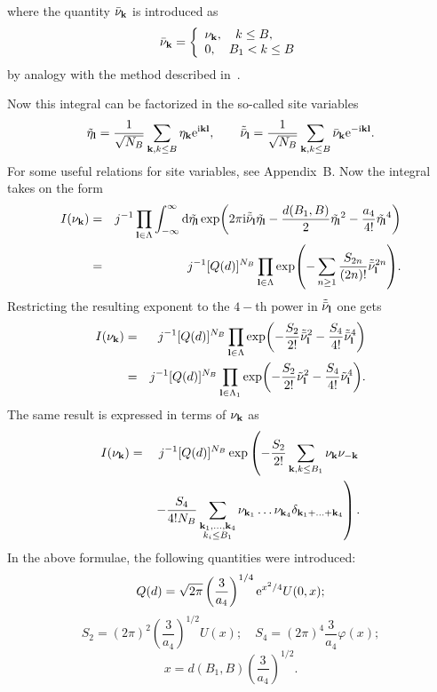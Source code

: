where the quantity $\bar{\nu}_{\vb k}$ is introduced as
\begin{equation*}
	\bar{\nu}_{\vb k} = \left\{
	\begin{array}{ll}
		\nu_{\vb k}, \quad k \leq B, \\
		0, \quad B_1 < k \leq B
	\end{array}
	\right.
\end{equation*}
by analogy with the method described in~\cite{MpkCMP2005}.

Now this integral can be factorized in the so-called site variables
\begin{equation*}
	\tilde{\eta}_{\vb l} = \frac{1}{\sqrt{N_B}}\sum_{\vb k, k \leq B}\eta_{\vb k}{\rm e}^{{\rm i}{\vb k}{\vb l}}, \qquad \tilde{\bar{\nu}}_{\vb l}=\frac{1}{\sqrt{N_B}}\sum_{\vb k, k \leq B}\bar{\nu}_{\vb k}{\rm e}^{-{\rm i}{\vb k}{\vb l}}.
\end{equation*}
For some useful relations for site variables, see Appendix~B.
Now the integral takes on the form
\begin{eqnarray*}
	I(\nu_{\vb k}) & = & j^{-1} \prod_{\vb l \in \Lambda} \int_{-\infty}^{\infty} {\rm d} \tilde{\eta_{\vb l}}
	\exp(2\pi{\rm i} \tilde{\bar{\nu}}_{\vb l} \tilde{\eta_{\vb l}} -\frac{d(B_1, B)}{2} \tilde{\eta_{\vb l}}^2 - \frac{a_4}{4!}\tilde{\eta_{\vb l}}^4 )
	\\
	& = & j^{-1} [Q(d)]^{N_B} \prod_{\vb l \in \Lambda} \exp(-\sum_{n \geq 1} \frac{S_{2n}}{(2n)!} \tilde{\bar{\nu}}_{\vb l}^{2n}).
\end{eqnarray*}
Restricting the resulting exponent to the $4-$th power in $\tilde{\bar{\nu}}_{\vb l}$ one gets
\begin{eqnarray*}
	I(\nu_{\vb k}) & = & j^{-1} [Q(d)]^{N_B} \prod_{\vb l \in \Lambda}
	\exp(-\frac{S_2}{2!}\tilde{\bar{\nu}}_{\vb l}^2 - \frac{S_4}{4!}\tilde{\bar{\nu}}_{\vb l}^4 )
	\\
	& = & j^{-1} [Q(d)]^{N_B} \prod_{\vb l \in \Lambda_1}
	\exp(-\frac{S_2}{2!}\tilde{\nu}_{\vb l}^2 - \frac{S_4}{4!}\tilde{\nu}_{\vb l}^4 ).
\end{eqnarray*}
The same result is expressed in terms of $\nu_{\vb k}$ as
\begin{eqnarray*}
	I(\nu_{\vb k}) & = & j^{-1} [Q(d)]^{N_B} 
	\exp \left(- \frac{S_2}{2!} \sum_{\vb k, k \leq B_1} \nu_{\vb k} \nu_{-\vb k}
	\right.
	\\
	& & \left.
	 - \frac{S_4}{4! N_B} \sum_{\substack{\vb k_1, \dotsc, \vb k_4 \\ k_i \leq B_1}} \nu_{\vb k_1} \dotsc \nu_{\vb k_4} \delta_{\vb{k}_1 + \dotsc + \vb{k}_4}
	 \right)
	 .
\end{eqnarray*}
In the above formulae, the following quantities were introduced:
\begin{equation*}
	Q(d) = \sqrt{2\pi}\left(\frac{3}{a_4}\right)^{1/4} {\rm e}^{x^2/4} U(0,x);
\end{equation*}
\begin{equation*}
	S_2 = (2\pi)^2 \left(\frac{3}{a_4}\right)^{1/2} U(x); \quad S_4 = (2\pi)^4 \frac{3}{a_4}\varphi(x);
\end{equation*}
\begin{equation*}
	x = d(B_1, B) \left(\frac{3}{a_4}\right)^{1/2}.
\end{equation*}

